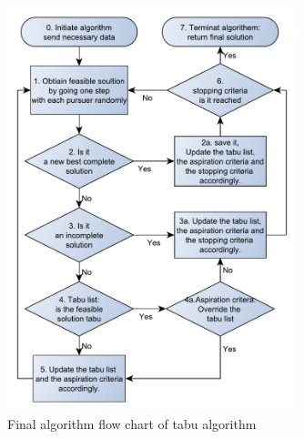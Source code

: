 \begin{figure}[!h]
\centering
\includegraphics[width=0.75\textwidth,height=0.70\textheight]{chapter_4_methods/ny_Tabu}
\caption[Final algorithm flow chart of tabu algorithm]
{Final algorithm flow chart of tabu algorithm}
\label{t2}
\end{figure}

